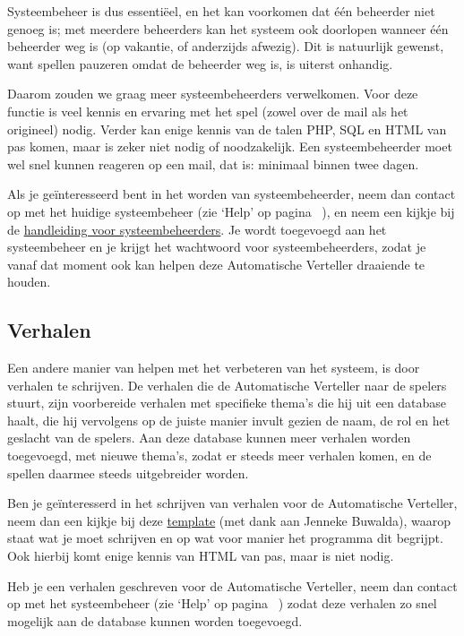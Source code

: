 \documentclass[12pt]{article}
\begin{document}
  Systeembeheer is dus essenti\"eel, en het kan voorkomen dat \'e\'en beheerder niet genoeg is; met meerdere beheerders kan het systeem ook doorlopen wanneer \'e\'en beheerder weg is (op vakantie, of anderzijds afwezig). Dit is natuurlijk gewenst, want spellen pauzeren omdat de beheerder weg is, is uiterst onhandig.  
  
  Daarom zouden we graag meer systeembeheerders verwelkomen. Voor deze functie is veel kennis en ervaring met het spel (zowel over de mail als het origineel) nodig. Verder kan enige kennis van de talen PHP, SQL en HTML van pas komen, maar is zeker niet nodig of noodzakelijk. Een systeembeheerder moet wel snel kunnen reageren op een mail, dat is: minimaal binnen twee dagen.
  
  Als je ge\"interesseerd bent in het worden van systeembeheerder, neem dan contact op met het huidige systeembeheer (zie `Help' op pagina~\pageref{subsec:help} ), en neem een kijkje bij de \href{http://www.liacs.nl/~vdekker/WW/pdf/manAdmin.pdf}{handleiding voor systeembeheerders}. Je wordt toegevoegd aan het systeembeheer en je krijgt het wachtwoord voor systeembeheerders, zodat je vanaf dat moment ook kan helpen deze Automatische Verteller draaiende te houden.

  \subsection{Verhalen} \label{subsec:verhalen}
  
  Een andere manier van helpen met het verbeteren van het systeem, is door verhalen te schrijven. De verhalen die de Automatische Verteller naar de spelers stuurt, zijn voorbereide verhalen met specifieke thema's die hij uit een database haalt, die hij vervolgens op de juiste manier invult gezien de naam, de rol en het geslacht van de spelers. Aan deze database kunnen meer verhalen worden toegevoegd, met nieuwe thema's, zodat er steeds meer verhalen komen, en de spellen daarmee steeds uitgebreider worden.
  
  Ben je ge\"interesserd in het schrijven van verhalen voor de Automatische Verteller, neem dan een kijkje bij deze \href{http://placeholder-voor-jennekes-template}{template} (met dank aan Jenneke Buwalda), waarop staat wat je moet schrijven en op wat voor manier het programma dit begrijpt. Ook hierbij komt enige kennis van HTML van pas, maar is niet nodig.
  
  Heb je een verhalen geschreven voor de Automatische Verteller, neem dan contact op met het systeembeheer (zie `Help' op pagina~\pageref{subsec:help} ) zodat deze verhalen zo snel mogelijk aan de database kunnen worden toegevoegd.
  
\end{document}
